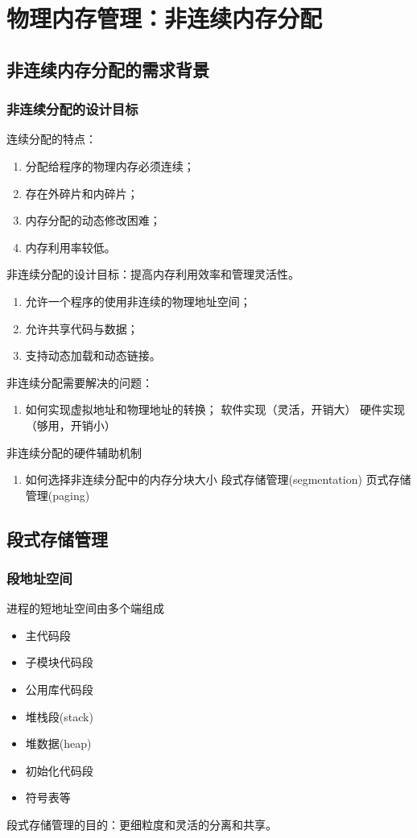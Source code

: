 \chapter{物理内存管理：非连续内存分配}
\section{非连续内存分配的需求背景}
\subsection{非连续分配的设计目标}
连续分配的特点：
\begin{enumerate}
	\item 分配给程序的物理内存必须连续；
	\item 存在外碎片和内碎片；
	\item 内存分配的动态修改困难；
	\item 内存利用率较低。
\end{enumerate}
非连续分配的设计目标：提高内存利用效率和管理灵活性。
\begin{enumerate}
	\item 允许一个程序的使用非连续的物理地址空间；
	\item 允许共享代码与数据；
	\item 支持动态加载和动态链接。
\end{enumerate}
非连续分配需要解决的问题：
\begin{enumerate}
	\item 如何实现虚拟地址和物理地址的转换；
	\subitem 软件实现（灵活，开销大）
	\subitem 硬件实现（够用，开销小）
\end{enumerate}
非连续分配的硬件辅助机制
\begin{enumerate}
	\item 如何选择非连续分配中的内存分块大小
	\subitem 段式存储管理(segmentation)
	\subitem 页式存储管理(paging)
\end{enumerate}

\section{段式存储管理}
\subsection{段地址空间}
进程的短地址空间由多个端组成
\begin{itemize}
	\item 主代码段
	\item 子模块代码段
	\item 公用库代码段
	\item 堆栈段(stack)
	\item 堆数据(heap)
	\item 初始化代码段
	\item 符号表等
\end{itemize}
段式存储管理的目的：更细粒度和灵活的分离和共享。
